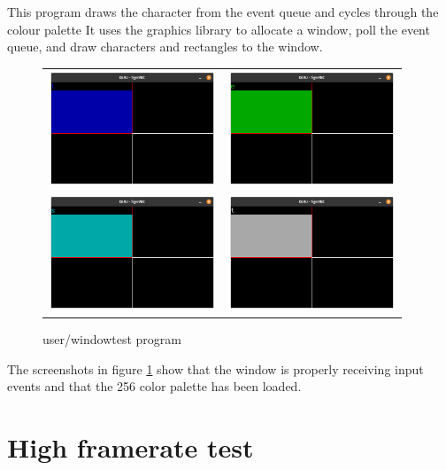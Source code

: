 This program draws the character from the event queue and cycles through the colour palette
It uses the graphics library to allocate a window, poll the event queue, and draw
characters and rectangles to the window.

\begin{figure}[H]
    \centering
    \begin{tabular}{cc}
    \includegraphics[width=5cm]{windowtest0.png} & \includegraphics[width=5cm]{windowtest1.png} \\
    \includegraphics[width=5cm]{windowtest2.png} & \includegraphics[width=5cm]{windowtest3.png} \\
    \end{tabular}
    \caption{user/windowtest program}
    \label{figure:windowtest}
\end{figure}

The screenshots in figure \ref{figure:windowtest} show that the window is
properly receiving input events and that the 256 color palette has been loaded.

\section{High framerate test}

